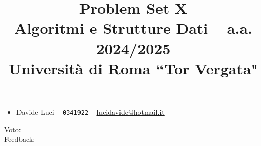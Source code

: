 \documentclass{article}
\title{Problem Set X\\
{\small Algoritmi e Strutture Dati -- a.a. 2024/2025}\\
{\small Università di Roma ``Tor Vergata"}
}
\date{}
\begin{document}
\maketitle

\begin{itemize}

    \item Davide Luci -- \texttt{0341922} -- \href{mailto:lucidavide@hotmail.it}{lucidavide@hotmail.it}

\end{itemize}

\bigskip
\begin{tcolorbox}[
    colback=white,           %
    colframe=black,          %
    coltitle=black,          %
    colbacktitle=gray!50,    %
    boxrule=1pt,             %
    title=\textbf{Valutazione complessiva}
    ]

\begin{description}
    \item[Voto:] 
    \item[Feedback:]
\end{description}
\vspace{21\baselineskip}

\end{tcolorbox}

\newpage

% 




\end{document}
